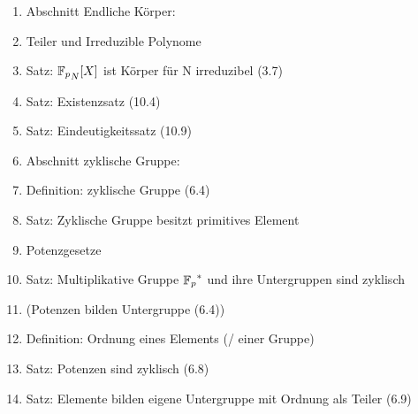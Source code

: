 \begin{comment}
\begin{enumerate}
    \item Abschnitt Einfache endliche Körper:
    \item Definition: Restklassenring $\mathbb{Z}_n$
    \item Satz: $\mathbb{Z}_n$ ist Ring
    \item Satz: $\mathbb{Z}_p$ ist Körper für $p$ Primzahl
    \item (Satz von Fermat)    
    
    \item Abschnitt Polynomringe:
    \item Definition: Polynom
    \item Satz: Division mit Rest existiert (2.6)
    \item Satz: Polynomringe (${\field{p}}[X]$ und ${\field{p}}_{N} [X]$) sind Ringe
\end{enumerate}
\end{comment}    
\begin{enumerate}    
    \item Abschnitt Endliche Körper:
    \item Teiler und Irreduzible Polynome
    \item Satz: ${\field{p}}_{N} [X]$ ist Körper für N irreduzibel (3.7)
    \item Satz: Existenzsatz (10.4)
    \item Satz: Eindeutigkeitssatz (10.9)
    
    \item Abschnitt zyklische Gruppe:
    \item Definition: zyklische Gruppe (6.4)
    \item Satz: Zyklische Gruppe besitzt primitives Element
    \item Potenzgesetze
    \item Satz: Multiplikative Gruppe ${\field{p}}^{\ast}$ und ihre Untergruppen sind zyklisch
    \item (Potenzen bilden Untergruppe (6.4))
    \item Definition: Ordnung eines Elements (/ einer Gruppe)
    \item Satz: Potenzen sind zyklisch (6.8)
    \item Satz: Elemente bilden eigene Untergruppe mit Ordnung als Teiler (6.9)
\end{enumerate}